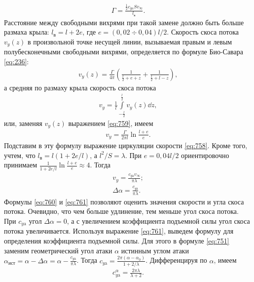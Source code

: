 	\begin{gather}\label{eq:758}
		\Gamma=\frac{\frac{1}{2}c_{y\mathrm{a}}Sv_\infty}{l_\mathrm{в}}.
	\end{gather}\n
	Расстояние между свободными вихрями при такой замене должно быть больше размаха крыла: $l_\mathrm{в}=l+2e$, где $e=\left(0,02\div0,04\right)l/2$.\n
	Скорость скоса потока $v_y\left(z\right)$ в произвольной точке несущей линии, вызываемая правым и левым полубесконечными свободными вихрями, определяется по формуле Био-Савара \eqref{eq:236}:
	\begin{gather}\label{eq:759}
		v_y\left(z\right)=\frac{\Gamma}{4\pi}\left(\frac{1}{\frac{l}{2}+e+z}+\frac{1}{\frac{l}{2}+l-z}\right),
	\end{gather}
	а средняя по размаху крыла скорость скоса потока
	\begin{gather*}
		v_y=\frac{1}{l}\int\limits_{-\frac{l}{2}}^{\frac{l}{2}}v_y\left(z\right)\dd z,
	\end{gather*}
	или, заменяя $v_y\left(z\right)$ выражением \eqref{eq:759}, имеем
	\begin{gather*}
		v_y=\frac{\Gamma}{2\pi l}\ln\frac{l+e}{e}.
	\end{gather*}\n
	Подставим в эту формулу выражение циркуляции скорости \eqref{eq:758}. Кроме того, учтем, что $l_\mathrm{в}=l\left(1+2e/l\right)$, а $l^2/S=\lambda$. При $e=0,04l/2$ ориентировочно принимаем $\frac{1}{1+2e/l}\ln\frac{l+e}{e}\approx 4$. Тогда
	\begin{gather}
		v_y=\frac{c_{y\mathrm{a}}v_\infty}{\pi\lambda};\label{eq:760}\\
		\Delta\alpha=\frac{c_{y\mathrm{a}}}{\pi\lambda}.\label{eq:761}
	\end{gather}\n
	Формулы \eqref{eq:760} и \eqref{eq:761} позволяют оценить значения скорости и угла скоса потока. Очевидно, что чем больше удлинение, тем меньше угол скоса потока. При $c_{y\mathrm{a}}$ угол $\Delta\alpha=0$, а с увеличением коэффициента подъемной силы угол скоса потока увеличивается.\n
	Используя выражение \eqref{eq:761}, выведем формулу для определения коэффициента подъемной силы. Для этого в формуле \eqref{eq:751} заменим геометрический угол атаки $\alpha$ истинным углом атаки $\alpha_\mathrm{ист}=\alpha-\Delta\alpha=\alpha-\frac{c_{y\mathrm{a}}}{\pi\lambda}$. Тогда $c_{y\mathrm{a}}=\frac{2\pi\left(\alpha-\alpha_0\right)}{1+2/\lambda}$. Дифференцируя по $\alpha$, имеем
	\begin{gather}\label{eq:762}
		c_{y\mathrm{a}}^\alpha=\frac{2\pi\lambda}{\lambda+2}.
	\end{gather}\n
